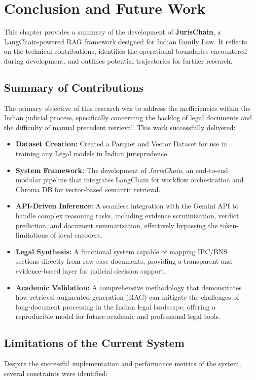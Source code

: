 \chapter{Conclusion and Future Work}
\label{ch:conclusion}

This chapter provides a summary of the development of \textbf{JurisChain}, a LangChain-powered RAG framework designed for Indian Family Law. It reflects on the technical contributions, identifies the operational boundaries encountered during development, and outlines potential trajectories for further research.

\section{Summary of Contributions}
The primary objective of this research was to address the inefficiencies within the Indian judicial process, specifically concerning the backlog of legal documents and the difficulty of manual precedent retrieval. This work successfully delivered:

\begin{itemize}
	\item \textbf{Dataset Creation:} Created a Parquet and Vector Dataset for use in training any Legal models in Indian jurisprudence.
	\item \textbf{System Framework:} The development of \textit{JurisChain}, an end-to-end modular pipeline that integrates LangChain for workflow orchestration and Chroma DB for vector-based semantic retrieval.
	\item \textbf{API-Driven Inference:} A seamless integration with the Gemini API to handle complex reasoning tasks, including evidence scrutinization, verdict prediction, and document summarization, effectively bypassing the token-limitations of local encoders.
	\item \textbf{Legal Synthesis:} A functional system capable of mapping IPC/BNS sections directly from raw case documents, providing a transparent and evidence-based layer for judicial decision support.
	\item \textbf{Academic Validation:} A comprehensive methodology that demonstrates how retrieval-augmented generation (RAG) can mitigate the challenges of long-document processing in the Indian legal landscape, offering a reproducible model for future academic and professional legal tools.
\end{itemize}

\section{Limitations of the Current System}
Despite the successful implementation and performance metrics of the system, several constraints were identified:

